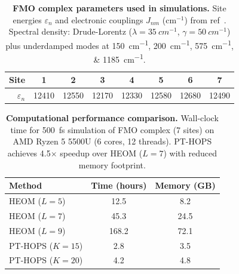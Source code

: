 \documentclass[11pt,a4paper]{article}
\begin{document}
\begin{table}[h]
\centering
\caption{\textbf{FMO complex parameters used in simulations.} Site energies $\varepsilon_n$ and electronic couplings $J_{nm}$ (cm$^{-1}$) from ref~\cite{Adolphs2006}. Spectral density: Drude-Lorentz ($\lambda = \SI{35}{cm^{-1}}$, $\gamma = \SI{50}{cm^{-1}}$) plus underdamped modes at \SIlist{150;200;575;1185}{cm^{-1}}.}
\label{tab:si_fmo_params}
\begin{tabular}{rccccccc}
\toprule
\textbf{Site} & \textbf{1} & \textbf{2} & \textbf{3} & \textbf{4} & \textbf{5} & \textbf{6} & \textbf{7} \\
\midrule
$\varepsilon_n$ & 12410 & 12550 & 12170 & 12330 & 12580 & 12680 & 12490 \\
\bottomrule
\end{tabular}
\end{table}

\begin{table}[h]
\centering
\caption{\textbf{Computational performance comparison.} Wall-clock time for \SI{500}{fs} simulation of FMO complex (7 sites) on AMD Ryzen 5 5500U (6 cores, 12 threads). PT-HOPS achieves \num{4.5}$\times$ speedup over HEOM ($L=7$) with reduced memory footprint.}
\label{tab:si_performance}
\begin{tabular}{lSS}
\toprule
\textbf{Method} & \textbf{Time (hours)} & \textbf{Memory (GB)} \\
\midrule
HEOM ($L=5$) & 12.5 & 8.2 \\
HEOM ($L=7$) & 45.3 & 24.5 \\
HEOM ($L=9$) & 168.2 & 72.1 \\
PT-HOPS ($K=15$) & 2.8 & 3.5 \\
PT-HOPS ($K=20$) & 4.2 & 4.8 \\
\bottomrule
\end{tabular}
\end{table}
\end{document}

